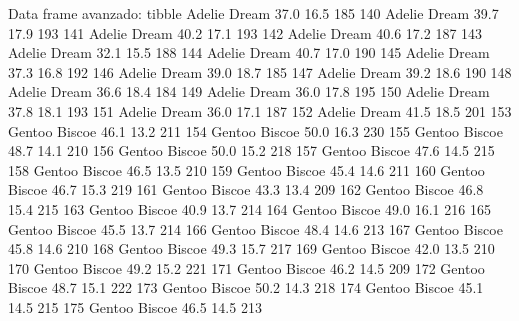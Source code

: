 \documentclass[
  ignorenonframetext,
  aspectratio=169]{beamer}
\let\oldverbatim\verbatim
\let\endoldverbatim\endverbatim
\renewenvironment{verbatim}{\tiny\oldverbatim}{\endoldverbatim}
\begin{document}
\begin{frame}[fragile]{Data frame avanzado: tibble}
\begin{verbatim}
139    Adelie     Dream           37.0          16.5               185
140    Adelie     Dream           39.7          17.9               193
141    Adelie     Dream           40.2          17.1               193
142    Adelie     Dream           40.6          17.2               187
143    Adelie     Dream           32.1          15.5               188
144    Adelie     Dream           40.7          17.0               190
145    Adelie     Dream           37.3          16.8               192
146    Adelie     Dream           39.0          18.7               185
147    Adelie     Dream           39.2          18.6               190
148    Adelie     Dream           36.6          18.4               184
149    Adelie     Dream           36.0          17.8               195
150    Adelie     Dream           37.8          18.1               193
151    Adelie     Dream           36.0          17.1               187
152    Adelie     Dream           41.5          18.5               201
153    Gentoo    Biscoe           46.1          13.2               211
154    Gentoo    Biscoe           50.0          16.3               230
155    Gentoo    Biscoe           48.7          14.1               210
156    Gentoo    Biscoe           50.0          15.2               218
157    Gentoo    Biscoe           47.6          14.5               215
158    Gentoo    Biscoe           46.5          13.5               210
159    Gentoo    Biscoe           45.4          14.6               211
160    Gentoo    Biscoe           46.7          15.3               219
161    Gentoo    Biscoe           43.3          13.4               209
162    Gentoo    Biscoe           46.8          15.4               215
163    Gentoo    Biscoe           40.9          13.7               214
164    Gentoo    Biscoe           49.0          16.1               216
165    Gentoo    Biscoe           45.5          13.7               214
166    Gentoo    Biscoe           48.4          14.6               213
167    Gentoo    Biscoe           45.8          14.6               210
168    Gentoo    Biscoe           49.3          15.7               217
169    Gentoo    Biscoe           42.0          13.5               210
170    Gentoo    Biscoe           49.2          15.2               221
171    Gentoo    Biscoe           46.2          14.5               209
172    Gentoo    Biscoe           48.7          15.1               222
173    Gentoo    Biscoe           50.2          14.3               218
174    Gentoo    Biscoe           45.1          14.5               215
175    Gentoo    Biscoe           46.5          14.5               213

\end{verbatim}
\end{frame}
\end{document}
